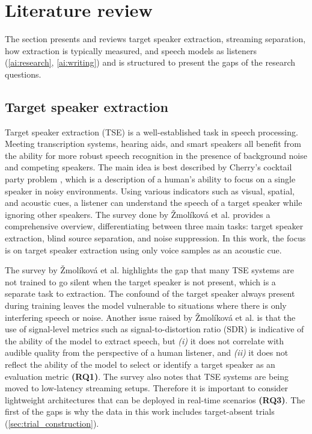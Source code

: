 \section{Literature review}
\label{sec:litreview}
The section presents and reviews target speaker extraction, streaming separation, how extraction is typically measured, and speech models as listeners (\ref{ai:research}, \ref{ai:writing}) and is structured to present the gaps of the research questions. 

\subsection{Target speaker extraction}
\label{sec:tse}

Target speaker extraction (TSE) is a well-established task in speech processing. Meeting transcription systems, hearing aids, and smart speakers all benefit from the ability for more robust speech recognition in the presence of background noise and competing speakers. The main idea is best described by Cherry's cocktail party problem \cite{cherry1953cocktail}, which is a description of a human's ability to focus on a single speaker in noisy environments. Using various indicators such as visual, spatial, and acoustic cues, a listener can understand the speech of a target speaker while ignoring other speakers. The survey done by \v{Z}mol\'{i}kov\'{a} et al. \cite{zmolikova2023overview} provides a comprehensive overview, differentiating between three main tasks: target speaker extraction, blind source separation, and noise suppression. In this work, the focus is on target speaker extraction using only voice samples as an acoustic cue.

 The survey by \v{Z}mol\'{i}kov\'{a} et al. \cite{zmolikova2023overview} highlights the gap that many TSE systems are not trained to go silent when the target speaker is not present, which is a separate task to extraction. The confound of the target speaker always present during training leaves the model vulnerable to situations where there is only interfering speech or noise. Another issue raised by \v{Z}mol\'{i}kov\'{a} et al. \cite{zmolikova2023overview} is that the use of signal-level metrics such as signal-to-distortion ratio (SDR) is indicative of the ability of the model to extract speech, but \textit{(i)} it does not correlate with audible quality from the perspective of a human listener, and \textit{(ii)} it does not reflect the ability of the model to select or identify a target speaker as an evaluation metric \textbf{(RQ1)}. The survey also notes that TSE systems are being moved to low-latency streaming setups. Therefore it is important to consider lightweight architectures that can be deployed in real-time scenarios \textbf{(RQ3)}. The first of the gaps is why the data in this work includes target-absent trials (\autoref{sec:trial_construction}).

